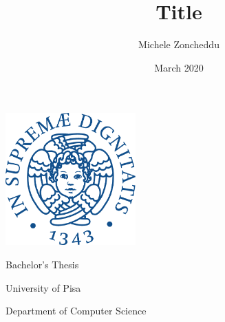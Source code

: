 \documentclass[a4paper, 12pt]{report}
\title{Title}
\author{Michele Zoncheddu}
\date{March 2020}
\begin{document}
	\begin{titlepage}
		\centering
		\includegraphics[height=12pc]{img/university_logos/cherubino_unipi.pdf}
		\bigbreak
		\bigbreak
		\bigbreak

		{\LARGE{\textbf{\@title}}}
		\bigbreak
		\bigbreak
		\medbreak

		{\large{Bachelor's Thesis}}
		\bigbreak
		\bigbreak
		\medbreak

		{\Large{\textbf{\@author}}}
		\bigbreak
		\bigbreak
		\medbreak

		{\Large{University of Pisa}}
		\bigbreak

		{\Large{Department of Computer Science}}
		\bigbreak

		{\Large{\@date}}
	\end{titlepage}


	\tableofcontents
	\newpage

	\sloppy

	
	\newpage
	
	\newpage
	
	\newpage
	
	\newpage
	

	\printbibliography[nottype=online, title=Bibliography]
	\printbibliography[type=online, title=Sitography]
\end{document}
